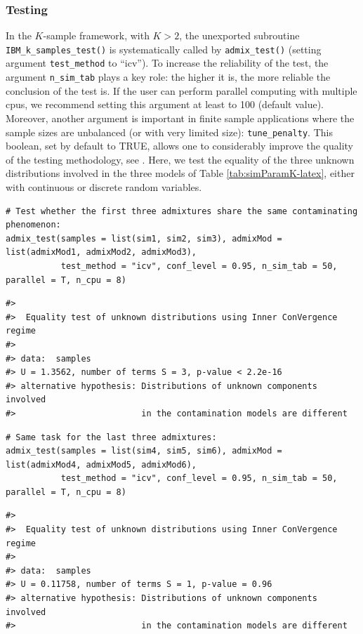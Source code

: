 \subsubsection{Testing}\label{testing}

In the \(K\)-sample framework, with \(K>2\), the unexported subroutine \texttt{IBM\_k\_samples\_test()} is systematically called by \texttt{admix\_test()} (setting argument \texttt{test\_method} to ``icv''). To increase the reliability of the test, the argument \texttt{n\_sim\_tab} plays a key role: the higher it is, the more reliable the conclusion of the test is. If the user can perform parallel computing with multiple cpus, we recommend setting this argument at least to 100 (default value). Moreover, another argument is important in finite sample applications where the sample sizes are unbalanced (or with very limited size): \texttt{tune\_penalty}. This boolean, set by default to TRUE, allows one to considerably improve the quality of the testing methodology, see \citep{Milhaud+Pommeret+Salhi+Vandekerkhove:2024b}. Here, we test the equality of the three unknown distributions involved in the three models of Table \ref{tab:simParamK-latex}, either with continuous or discrete random variables.

\begin{verbatim}
# Test whether the first three admixtures share the same contaminating phenomenon:
admix_test(samples = list(sim1, sim2, sim3), admixMod = list(admixMod1, admixMod2, admixMod3),
           test_method = "icv", conf_level = 0.95, n_sim_tab = 50, parallel = T, n_cpu = 8)
\end{verbatim}

\begin{verbatim}
#> 
#>  Equality test of unknown distributions using Inner ConVergence regime
#> 
#> data:  samples
#> U = 1.3562, number of terms S = 3, p-value < 2.2e-16
#> alternative hypothesis: Distributions of unknown components involved 
#>                         in the contamination models are different
\end{verbatim}

\begin{verbatim}
# Same task for the last three admixtures:
admix_test(samples = list(sim4, sim5, sim6), admixMod = list(admixMod4, admixMod5, admixMod6),
           test_method = "icv", conf_level = 0.95, n_sim_tab = 50, parallel = T, n_cpu = 8)
\end{verbatim}

\begin{verbatim}
#> 
#>  Equality test of unknown distributions using Inner ConVergence regime
#> 
#> data:  samples
#> U = 0.11758, number of terms S = 1, p-value = 0.96
#> alternative hypothesis: Distributions of unknown components involved 
#>                         in the contamination models are different
\end{verbatim}

